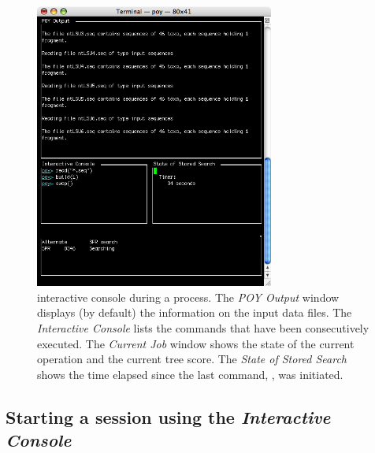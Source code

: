 {\begin{figure}[htbp]
   \centering
   \includegraphics[width=0.7\textwidth]{doc/figures/figprocess.jpg}
   \caption{\poy interactive console during a process. The \emph{POY Output} window displays (by default) the information on the input data files. The \emph{Interactive Console} lists the commands that have been consecutively executed. The \emph{Current Job} window shows the state of the current operation and the current tree score. The \emph{State of Stored Search} shows the time elapsed  since the last command, , was initiated.}
   \label{fig:figprocess}
\end{figure}



\subsection{Starting a \poy session using the \emph{Interactive Console}}

}
